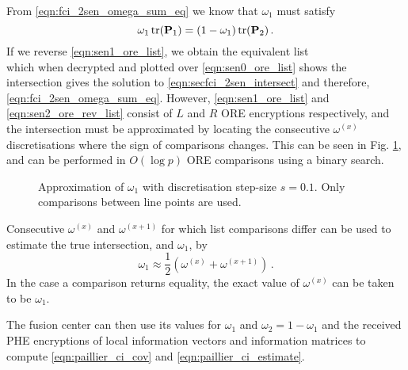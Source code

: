 \documentclass[letterpaper, 10 pt, conference]{ieeeconf}  %
\begin{document}
From \eqref{eqn:fci_2sen_omega_sum_eq} we know that $\omega_1$ must satisfy
\begin{equation}
   \omega_1 \operatorname{tr}({{\mathbf{P}}}_1) = (1-\omega_1)\operatorname{tr}({{\mathbf{P}}}_2)\,. \label{eqn:secfci_2sen_intersect}
\end{equation}
If we reverse \eqref{eqn:sen1_ore_list}, we obtain the equivalent list
\begin{equation}
   [\mathcal{E}^R_{ORE}((1-\omega^{(1)})\tr(\mP_2)),\dots,\mathcal{E}^R_{ORE}((1-\omega^{(p)})\tr(\mP_2))] \label{eqn:sen2_ore_rev_list}
\end{equation}
which when decrypted and plotted over \eqref{eqn:sen0_ore_list} shows the intersection gives the solution to \eqref{eqn:secfci_2sen_intersect} and therefore, \eqref{eqn:fci_2sen_omega_sum_eq}. However, \eqref{eqn:sen1_ore_list} and \eqref{eqn:sen2_ore_rev_list} consist of $L$ and $R$ ORE encryptions respectively, and the intersection must be approximated by locating the consecutive $\omega^{(x)}$ discretisations where the sign of comparisons changes. This can be seen in Fig. \ref{fig:2_sensor_sol}, and can be performed in $O(\log{p})$ ORE comparisons using a binary search.
\begin{figure}[tb]
   \vspace{-5pt}
   \begin{center}
      
   \end{center}
   \vspace{-10pt}
   \caption{Approximation of $\omega_1$ with discretisation step-size $s=0.1$. Only comparisons between line points are used.}
   \vspace{-\baselineskip}
   \label{fig:2_sensor_sol}
\end{figure}
Consecutive $\omega^{(x)}$ and $\omega^{(x+1)}$ for which list comparisons differ can be used to estimate the true intersection, and $\omega_1$, by
\begin{equation}
   \omega_1 \approx \frac{1}{2}(\omega^{(x)} + \omega^{(x+1)})\,. \label{eqn:secfci_2sen_omega}
\end{equation}
In the case a comparison returns equality, the exact value of $\omega^{(x)}$ can be taken to be $\omega_1$.

The fusion center can then use its values for $\omega_1$ and $\omega_2 = 1-\omega_1$ and the received PHE encryptions of local information vectors and information matrices to compute \eqref{eqn:paillier_ci_cov} and \eqref{eqn:paillier_ci_estimate}.

\end{document}
